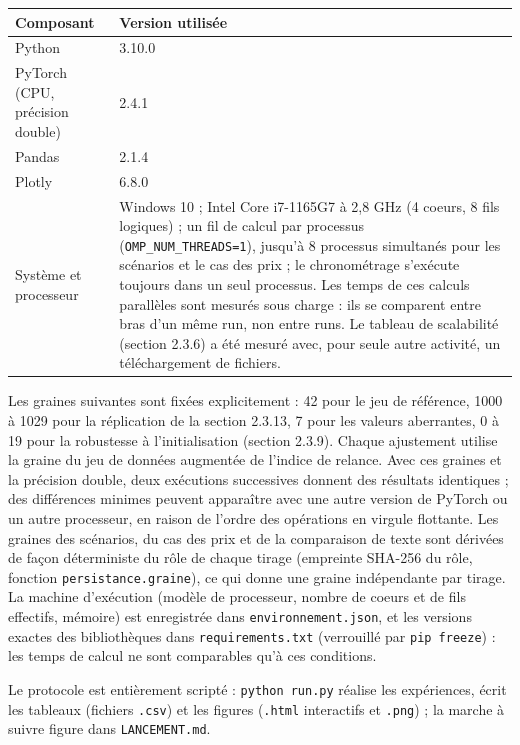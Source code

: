 \begin{table}[H]
\centering
\small
\setlength{\tabcolsep}{0.14cm}
\begin{tabular}{|p{7.42cm}|p{7.42cm}|}
\hline
\textbf{Composant} & \textbf{Version utilisée} \\
\hline
Python & 3.10.0 \\
\hline
PyTorch (CPU, précision double) & 2.4.1 \\
\hline
Pandas & 2.1.4 \\
\hline
Plotly & 6.8.0 \\
\hline
Système et processeur & Windows 10 ; Intel Core i7-1165G7 à 2,8 GHz (4 coeurs, 8 fils logiques) ; un fil de calcul par processus (\texttt{OMP\_NUM\_THREADS=1}), jusqu'à 8 processus simultanés pour les scénarios et le cas des prix ; le chronométrage s'exécute toujours dans un seul processus. Les temps de ces calculs parallèles sont mesurés sous charge : ils se comparent entre bras d'un même run, non entre runs. Le tableau de scalabilité (section 2.3.6) a été mesuré avec, pour seule autre activité, un téléchargement de fichiers. \\
\hline
\end{tabular}
\end{table}
Les graines suivantes sont fixées explicitement : 42 pour le jeu de référence, 1000 à 1029 pour la réplication de la section 2.3.13, 7 pour les valeurs aberrantes, 0 à 19 pour la robustesse à l'initialisation (section 2.3.9). Chaque ajustement utilise la graine du jeu de données augmentée de l'indice de relance. Avec ces graines et la précision double, deux exécutions successives donnent des résultats identiques ; des différences minimes peuvent apparaître avec une autre version de PyTorch ou un autre processeur, en raison de l'ordre des opérations en virgule flottante. Les graines des scénarios, du cas des prix et de la comparaison de texte sont dérivées de façon déterministe du rôle de chaque tirage (empreinte SHA-256 du rôle, fonction \texttt{persistance.graine}), ce qui donne une graine indépendante par tirage. La machine d'exécution (modèle de processeur, nombre de coeurs et de fils effectifs, mémoire) est enregistrée dans \texttt{environnement.json}, et les versions exactes des bibliothèques dans \texttt{requirements.txt} (verrouillé par \texttt{pip freeze}) : les temps de calcul ne sont comparables qu'à ces conditions.

Le protocole est entièrement scripté : \texttt{python run.py} réalise les expériences, écrit les tableaux (fichiers \texttt{.csv}) et les figures (\texttt{.html} interactifs et \texttt{.png}) ; la marche à suivre figure dans \texttt{LANCEMENT.md}.

